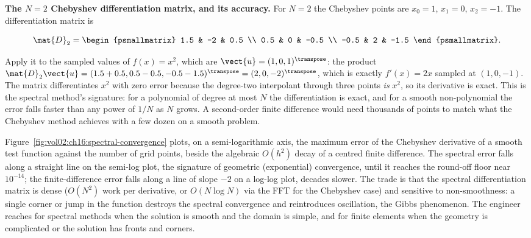 \begin{example}
\textbf{The $N = 2$ Chebyshev differentiation matrix, and its accuracy.} For
$N = 2$ the Chebyshev points are $x_{0} = 1$, $x_{1} = 0$, $x_{2} = -1$. The
differentiation matrix is

\[
\mat{D}_{2} = \begin{psmallmatrix}
1.5 & -2 & 0.5 \\
0.5 & 0 & -0.5 \\
-0.5 & 2 & -1.5
\end{psmallmatrix}.
\]

Apply it to the sampled values of $f(x) = x^{2}$, which are $\vect{u} =
(1, 0, 1)^{\transpose}$: the product $\mat{D}_{2}\vect{u} = (1.5 + 0.5,
0.5 - 0.5, -0.5 - 1.5)^{\transpose} = (2, 0, -2)^{\transpose}$, which is
exactly $f'(x) = 2x$ sampled at $(1, 0, -1)$. The matrix differentiates
$x^{2}$ with zero error because the degree-two interpolant through three
points \emph{is} $x^{2}$, so its derivative is exact. This is the spectral
method's signature: for a polynomial of degree at most $N$ the differentiation
is exact, and for a smooth non-polynomial the error falls faster than any
power of $1/N$ as $N$ grows. A second-order finite difference would need
thousands of points to match what the Chebyshev method achieves with a
few dozen on a smooth problem.
\end{example}



Figure~\ref{fig:vol02:ch16:spectral-convergence} plots, on a semi-logarithmic
axis, the maximum error of the Chebyshev derivative of a smooth test function
against the number of grid points, beside the algebraic $O(h^{2})$ decay of a
centred finite difference. The spectral error falls along a straight line on
the semi-log plot, the signature of geometric (exponential) convergence,
until it reaches the round-off floor near $10^{-14}$; the finite-difference
error falls along a line of slope $-2$ on a log-log plot, decades slower. The
trade is that the spectral differentiation matrix is dense ($O(N^{2})$ work
per derivative, or $O(N \log N)$ via the FFT for the Chebyshev case) and
sensitive to non-smoothness: a single corner or jump in the function destroys
the spectral convergence and reintroduces oscillation, the Gibbs phenomenon.
The engineer reaches for spectral methods when the solution is smooth and the
domain is simple, and for finite elements when the geometry is complicated or
the solution has fronts and corners.

